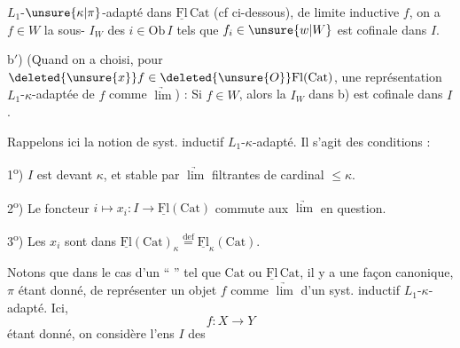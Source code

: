 $L_1$-$\unsure{\kappa|\pi}$-adapté dans $\underline{\mathrm{Fl}}\,\mathrm{Cat}$ (cf ci-dessous), de limite inductive $f$, on a $f\in W$  la sous- $I_W$ des $i\in\mathrm{Ob}\,I$ tels que $f_i\in \unsure{w|W}$ est cofinale dans $I$.

b$'$) (Quand on a choisi, pour  $\deleted{\unsure{x}}f\in\deleted{\unsure{O}}\mathrm{Fl}(\mathrm{Cat})$, une représentation $L_1$-$\kappa$-adaptée de $f$ comme $\underrightarrow{\lim}$) : Si $f\in W$, alors la  $I_W$  dans b) est cofinale dans $I$.

Rappelons ici la notion de syst. inductif $L_1$-$\kappa$-adapté. Il s'agit des conditions :

1\textsuperscript{o}) $I$ est  devant $\kappa$, et stable par $\underrightarrow{\lim}$ filtrantes de cardinal $\leq\kappa$.

2\textsuperscript{o}) Le foncteur $i\mapsto x_i:I\longrightarrow\underline{\mathrm{Fl}}(\mathrm{Cat})$ commute aux $\underrightarrow{\lim}$ en question.

3\textsuperscript{o}) Les $x_i$ sont dans $\underline{\mathrm{Fl}}(\mathrm{Cat})_\kappa\overset{\mathrm{def}}{=}\underline{\mathrm{Fl}}_\kappa(\mathrm{Cat})$.

Notons que dans le cas d'un `` '' tel que $\mathrm{Cat}$ ou $\underline{\mathrm{Fl}}\,\mathrm{Cat}$, il y a une façon canonique, $\pi$ étant donné, de représenter un objet $f$ comme $\underrightarrow{\lim}$ d'un syst. inductif $L_1$-$\kappa$-adapté.
Ici, 
\[
f:X\longrightarrow Y
\]
étant donné, on considère l'ens $I$ des
